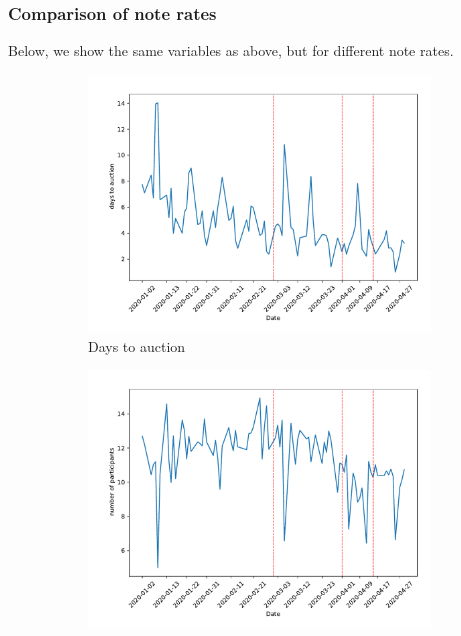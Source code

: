 \documentclass[11pt,a4paper]{article}
\begin{document}
\pagebreak
\subsubsection{Comparison of note rates}

Below, we show the same variables as above, but for different note rates. 

\begin{figure}[h]
  \centering
  \begin{subfigure}[b]{0.49\textwidth}
      \includegraphics[width=0.998\textwidth]{../results/figures/DaysToAuction_mean_mat30_loan1_timeseries_nr_3_3.75.pdf}
      \caption{Days to auction}
     \end{subfigure}
     \begin{subfigure}[b]{0.49\textwidth}
      \includegraphics[width=0.998\textwidth]{../results/figures/Number of Participants_mean_mat30_loan1_timeseries_nr_3_3.75.pdf}

\end{subfigure}
\end{figure}
\end{document}

